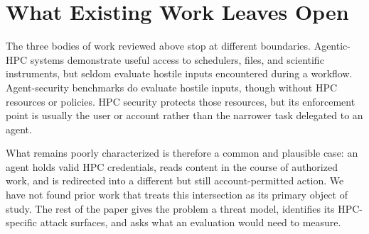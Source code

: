\section{What Existing Work Leaves Open}
\label{sec:gap}

The three bodies of work reviewed above stop at different boundaries. Agentic-HPC systems demonstrate useful access to schedulers, files, and scientific instruments, but seldom evaluate hostile inputs encountered during a workflow. Agent-security benchmarks do evaluate hostile inputs, though without HPC resources or policies. HPC security protects those resources, but its enforcement point is usually the user or account rather than the narrower task delegated to an agent.

What remains poorly characterized is therefore a common and plausible case: an agent holds valid HPC credentials, reads content in the course of authorized work, and is redirected into a different but still account-permitted action. We have not found prior work that treats this intersection as its primary object of study. The rest of the paper gives the problem a threat model, identifies its HPC-specific attack surfaces, and asks what an evaluation would need to measure.
